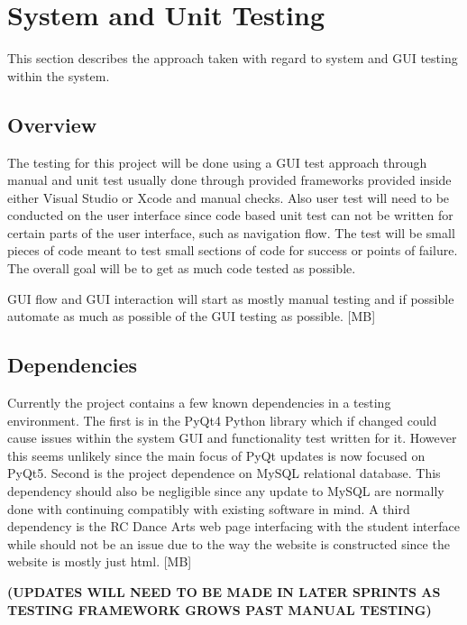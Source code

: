
\chapter{System  and Unit Testing}

This section describes the approach taken with regard to system and GUI testing within the system. 

\section{Overview}
The testing for this project will be done using a GUI test approach through manual and unit test usually done through provided frameworks provided inside either Visual Studio or Xcode and manual checks. Also user test will need to be conducted on the user interface since code based unit test can not be written for certain parts of the user interface, such as navigation flow. The test will be small pieces of code meant to test small sections of code for success or points of failure. The overall goal will be to get as much code tested as possible.

GUI flow and GUI interaction will start as mostly manual testing and if possible automate as much as possible of the GUI testing as possible. [MB] 

\section{Dependencies}
Currently the project contains a few known dependencies in a testing environment. The first is in the PyQt4 Python library which if changed could cause issues within the system GUI and functionality test written for it. However this seems unlikely since the main focus of PyQt updates is now focused on PyQt5. Second is the project dependence on MySQL relational database. This dependency should also be negligible since any update to MySQL are normally done with continuing compatibly with existing software in mind. A third dependency is the RC Dance Arts web page interfacing with the student interface while should not be an issue due to the way the website is constructed since the website is mostly just html. [MB]

\bf (UPDATES WILL NEED TO BE MADE IN LATER SPRINTS AS TESTING FRAMEWORK GROWS PAST MANUAL TESTING) 


